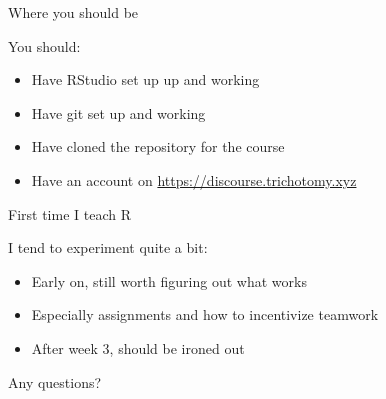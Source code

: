 \documentclass[ignorenonframetext,]{beamer}
\providecommand{\tightlist}{%
  \setlength{\itemsep}{0pt}\setlength{\parskip}{0pt}}
\begin{document}
\begin{frame}{Where you should be}
\protect\hypertarget{where-you-should-be}{}

You should:

\begin{itemize}
\tightlist
\item
  Have RStudio set up up and working
\item
  Have git set up and working
\item
  Have cloned the repository for the course
\item
  Have an account on \url{https://discourse.trichotomy.xyz}
\end{itemize}

\end{frame}

\begin{frame}{First time I teach R}
\protect\hypertarget{first-time-i-teach-r}{}

I tend to experiment quite a bit:

\begin{itemize}
\tightlist
\item
  Early on, still worth figuring out what works
\item
  Especially assignments and how to incentivize teamwork
\item
  After week 3, should be ironed out
\end{itemize}

\pause{}

Any questions?

\end{frame}
\end{document}
